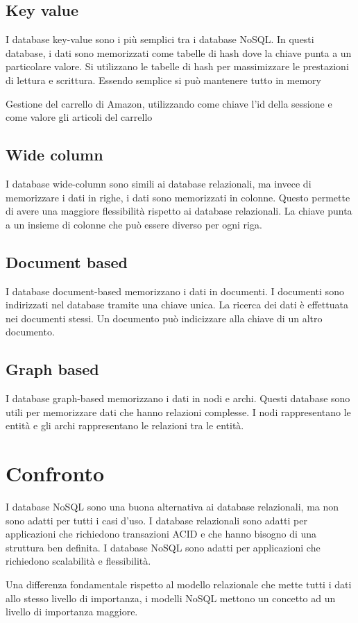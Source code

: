 \subsection{Key value}
I database key-value sono i più semplici tra i database NoSQL. In questi
database, i dati sono memorizzati come tabelle di hash dove la chiave punta a un
particolare valore. Si utilizzano le tabelle di hash per massimizzare le prestazioni
di lettura e scrittura. Essendo semplice si può mantenere tutto in memory

\begin{esempio}
    Gestione del carrello di Amazon, utilizzando come chiave l'id della sessione
    e come valore gli articoli del carrello
\end{esempio}

\subsection{Wide column}
I database wide-column sono simili ai database relazionali, ma invece di
memorizzare i dati in righe, i dati sono memorizzati in colonne. Questo permette
di avere una maggiore flessibilità rispetto ai database relazionali. La chiave 
punta a un insieme di colonne che può essere diverso per ogni riga.

\subsection{Document based}
I database document-based memorizzano i dati in documenti. I documenti sono 
indirizzati nel database tramite una chiave unica. La ricerca dei dati è
effettuata nei documenti stessi. Un documento può indicizzare alla chiave di un 
altro documento.

\subsection{Graph based}
I database graph-based memorizzano i dati in nodi e archi. Questi database sono
utili per memorizzare dati che hanno relazioni complesse. I nodi rappresentano
le entità e gli archi rappresentano le relazioni tra le entità.

\section{Confronto}
I database NoSQL sono una buona alternativa ai database relazionali, ma non
sono adatti per tutti i casi d'uso. I database relazionali sono adatti per
applicazioni che richiedono transazioni ACID e che hanno bisogno di una
struttura ben definita. I database NoSQL sono adatti per applicazioni che
richiedono scalabilità e flessibilità.

Una differenza fondamentale rispetto al modello relazionale che mette tutti i 
dati allo stesso livello di importanza, i modelli NoSQL mettono un concetto ad 
un livello di importanza maggiore.

